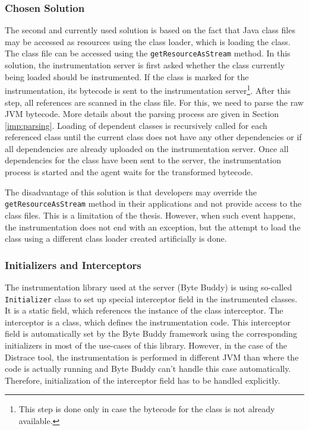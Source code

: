 \subsubsection{Chosen Solution}
The second and currently used solution is based on the fact that Java class files may be accessed as resources using the class loader, which is loading the class. The class file can be accessed using the \texttt{getResourceAsStream} method. In this solution, the instrumentation server is first asked whether the class currently being loaded should be instrumented. If the class is marked for the instrumentation, its bytecode is sent to the instrumentation server\footnote{This step is done only in case the bytecode for the class is not already available.}. After this step, all references are scanned in the class file. For this, we need to parse the raw JVM bytecode. More details about the parsing process are given in Section \ref{imp:parsing}. Loading of dependent classes is recursively called for each referenced class until the current class does not have any other dependencies or if all dependencies are already uploaded on the instrumentation server. Once all dependencies for the class have been sent to the server, the instrumentation process is started and the agent waits for the transformed bytecode. 

The disadvantage of this solution is that developers may override the \linebreak \texttt{getResourceAsStream} method in their applications and not provide access to the class files. This is a limitation of the thesis. However, when such event happens, the instrumentation does not end with an exception, but the attempt to load the class using a different class loader created artificially is done. 

\subsubsection{Initializers and Interceptors}
The instrumentation library used at the server (Byte Buddy) is using so-called \texttt{Initializer} class to set up special interceptor field in the instrumented classes. It is a static field, which references the instance of the class interceptor. The interceptor is a class, which defines the instrumentation code. This interceptor field is automatically set by the Byte Buddy framework using the corresponding initializers in most of the use-cases of this library. However, in the case of the Distrace tool, the instrumentation is performed in different JVM than where the code is actually running and Byte Buddy can't handle this case automatically. Therefore, initialization of the interceptor field has to be handled explicitly.

